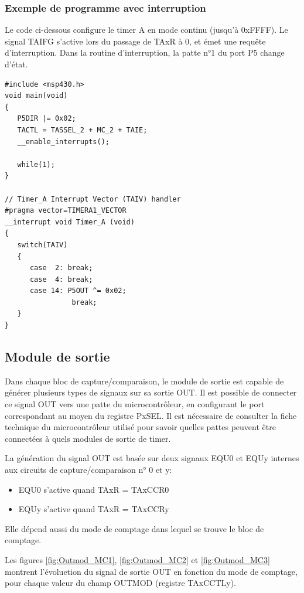 \begin{minipage}{16cm}{
\subsubsection*{Exemple de programme avec interruption}
Le code ci-dessous configure le timer A en mode continu (jusqu'à 0xFFFF). Le signal TAIFG s'active lors du passage de TAxR à 0, et émet une requête d'interruption. Dans la routine d'interruption, la patte n°1 du port P5 change d'état.

\lstset{style=customc}
\begin{lstlisting}
#include <msp430.h>
void main(void)
{
   P5DIR |= 0x02;
   TACTL = TASSEL_2 + MC_2 + TAIE;
   __enable_interrupts();
  
   while(1);
}

// Timer_A Interrupt Vector (TAIV) handler
#pragma vector=TIMERA1_VECTOR
__interrupt void Timer_A (void)
{
   switch(TAIV)
   {
      case  2: break;
      case  4: break;
      case 14: P5OUT ^= 0x02;
                break;
   }
}
\end{lstlisting}
}
\end{minipage}

\subsection{Module de sortie}
\label{Module de sortie}
Dans chaque bloc de capture/comparaison, le module de sortie est capable de générer plusieurs types de signaux sur sa sortie OUT. Il est possible de connecter ce signal OUT vers une patte du microcontrôleur, en configurant le port correspondant au moyen du registre PxSEL.
Il est nécessaire de consulter la fiche technique du microcontrôleur utilisé pour savoir quelles pattes peuvent être connectées à quels modules de sortie de timer.

La génération du signal OUT est basée sur deux signaux EQU0 et EQUy internes aux circuits de capture/comparaison n° 0 et y:
\begin{itemize}[label=\textbullet,font=\small]
\item EQU0 s'active quand TAxR = TAxCCR0
\item EQUy s'active quand TAxR = TAxCCRy
\end{itemize}
Elle dépend aussi du mode de comptage dans lequel se trouve le bloc de comptage.

Les figures \ref{fig:Outmod_MC1}, \ref{fig:Outmod_MC2} et \ref{fig:Outmod_MC3} montrent l'évoluetion du signal de sortie OUT en fonction du mode de comptage, pour chaque valeur du champ OUTMOD (registre TAxCCTLy).

